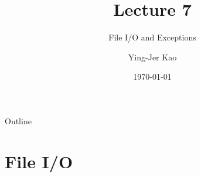 \documentclass[handout]{beamer}
\title[File I/O and Exceptions] %
{Lecture 7}
\subtitle
{File I/O and Exceptions} %
\author[Ying-Jer Kao] %
{Ying-Jer Kao}
\institute[National Taiwan University] %
{
  Department of Physics\\
 National Taiwan University
  }
\date[Numerical Analysis and Programming] %
{\today}
\begin{document}
\begin{frame}
  \titlepage
\end{frame}

\begin{frame}{Outline}
  \tableofcontents
\end{frame}




\section[File I/O]{File I/O}
\end{document}
